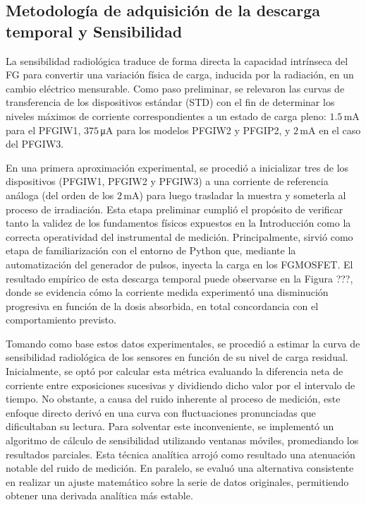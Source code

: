 \documentclass[12pt,a4paper,oneside]{book}
\begin{document}
\subsection{Metodología de adquisición de la descarga temporal y Sensibilidad}
La sensibilidad radiológica traduce de forma directa la capacidad intrínseca del FG para convertir una variación física de carga, inducida por la radiación, en un cambio eléctrico mensurable. Como paso preliminar, se relevaron las curvas de transferencia de los dispositivos estándar (STD) con el fin de determinar los niveles máximos de corriente correspondientes a un estado de carga pleno: $1.5$\,\si{\milli\ampere} para el PFGIW1, $375$\,\si{\micro\ampere} para los modelos PFGIW2 y PFGIP2, y $2$\,\si{\milli\ampere} en el caso del PFGIW3. 

En una primera aproximación experimental, se procedió a inicializar tres de los dispositivos (PFGIW1, PFGIW2 y PFGIW3) a una corriente de referencia análoga (del orden de los $2$\,\si{\milli\ampere}) para luego trasladar la muestra y someterla al proceso de irradiación. Esta etapa preliminar cumplió el propósito de verificar tanto la validez de los fundamentos físicos expuestos en la Introducción como la correcta operatividad del instrumental de medición. Principalmente, sirvió como etapa de familiarización con el entorno de Python que, mediante la automatización del generador de pulsos, inyecta la carga en los FGMOSFET. El resultado empírico de esta descarga temporal puede observarse en la Figura ???, donde se evidencia cómo la corriente medida experimentó una disminución progresiva en función de la dosis absorbida, en total concordancia con el comportamiento previsto.

Tomando como base estos datos experimentales, se procedió a estimar la curva de sensibilidad radiológica de los sensores en función de su nivel de carga residual. Inicialmente, se optó por calcular esta métrica evaluando la diferencia neta de corriente entre exposiciones sucesivas y dividiendo dicho valor por el intervalo de tiempo. No obstante, a causa del ruido inherente al proceso de medición, este enfoque directo derivó en una curva con fluctuaciones pronunciadas que dificultaban su lectura. Para solventar este inconveniente, se implementó un algoritmo de cálculo de sensibilidad utilizando ventanas móviles, promediando los resultados parciales. Esta técnica analítica arrojó como resultado una atenuación notable del ruido de medición. En paralelo, se evaluó una alternativa consistente en realizar un ajuste matemático sobre la serie de datos originales, permitiendo obtener una derivada analítica más estable.
\end{document}
